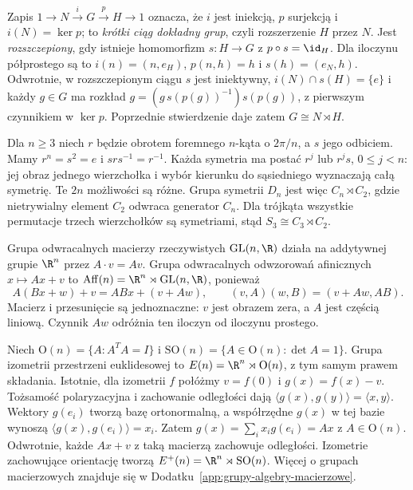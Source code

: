 \begin{uwaga}
Zapis $1\to N\xrightarrow{i}G\xrightarrow{p}H\to1$ oznacza,
że $i$ jest iniekcją, $p$ surjekcją i $i(N)=\ker p$; to
\emph{krótki ciąg dokładny grup}, czyli rozszerzenie $H$ przez $N$.
Jest \emph{rozszczepiony}, gdy istnieje homomorfizm $s:H\to G$
z $p\circ s=\id_H$. Dla iloczynu półprostego są to
$i(n)=(n,e_H)$, $p(n,h)=h$ i $s(h)=(e_N,h)$.
Odwrotnie, w rozszczepionym ciągu $s$ jest iniektywny,
$i(N)\cap s(H)=\{e\}$ i każdy $g\in G$ ma rozkład
$g=(g\,s(p(g))^{-1})s(p(g))$, z pierwszym czynnikiem w $\ker p$.
Poprzednie stwierdzenie daje zatem $G\cong N\rtimes H$.
\end{uwaga}

\begin{przyklad}
Dla $n\geq3$ niech $r$ będzie obrotem foremnego $n$-kąta o $2\pi/n$,
a $s$ jego odbiciem. Mamy $r^n=s^2=e$ i $srs^{-1}=r^{-1}$.
Każda symetria ma postać $r^j$ lub $r^js$, $0\leq j<n$:
jej obraz jednego wierzchołka i wybór kierunku do sąsiedniego
wyznaczają całą symetrię. Te $2n$ możliwości są różne.
Grupa symetrii $D_n$ jest więc $C_n\rtimes C_2$, gdzie nietrywialny
element $C_2$ odwraca generator $C_n$. Dla trójkąta wszystkie
permutacje trzech wierzchołków są symetriami, stąd
$S_3\cong C_3\rtimes C_2$.
\end{przyklad}

\begin{przyklad}
Grupa odwracalnych macierzy rzeczywistych $\mathrm{GL}(n,\R)$
działa na addytywnej grupie $\R^n$ przez $A\cdot v=Av$.
Grupa odwracalnych odwzorowań afinicznych $x\mapsto Ax+v$ to
$\operatorname{Aff}(n)=\R^n\rtimes\mathrm{GL}(n,\R)$, ponieważ
\[
 A(Bx+w)+v=ABx+(v+Aw),\qquad
 (v,A)(w,B)=(v+Aw,AB).
\]
Macierz i przesunięcie są jednoznaczne: $v$ jest obrazem zera,
a $A$ jest częścią liniową. Czynnik $Aw$ odróżnia ten iloczyn
od iloczynu prostego.
\end{przyklad}

\begin{przyklad}
Niech $\mathrm O(n)=\{A:A^TA=I\}$ i
$\mathrm{SO}(n)=\{A\in\mathrm O(n):\det A=1\}$.
Grupa izometrii przestrzeni euklidesowej to
$E(n)=\R^n\rtimes\mathrm O(n)$, z tym samym prawem składania.
Istotnie, dla izometrii $f$ połóżmy $v=f(0)$ i $g(x)=f(x)-v$.
Tożsamość polaryzacyjna i zachowanie odległości dają
$\langle g(x),g(y)\rangle=\langle x,y\rangle$.
Wektory $g(e_i)$ tworzą bazę ortonormalną, a współrzędne $g(x)$
w tej bazie wynoszą $\langle g(x),g(e_i)\rangle=x_i$.
Zatem $g(x)=\sum_i x_i g(e_i)=Ax$ z $A\in\mathrm O(n)$.
Odwrotnie, każde $Ax+v$ z taką macierzą zachowuje odległości.
Izometrie zachowujące orientację tworzą
$E^+(n)=\R^n\rtimes\mathrm{SO}(n)$.
Więcej o grupach macierzowych znajduje się w
Dodatku~\ref{app:grupy-algebry-macierzowe}.
\end{przyklad}

